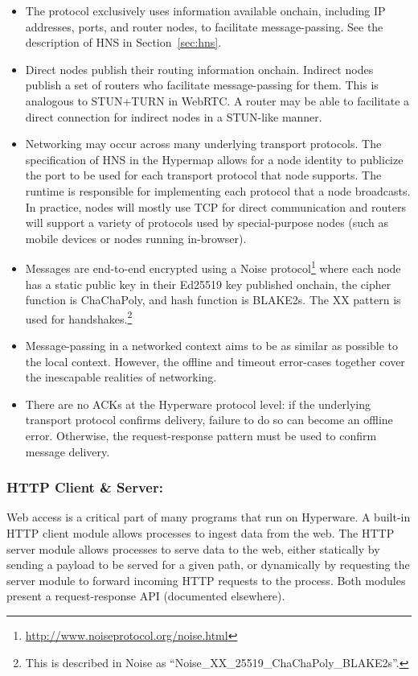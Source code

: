 \documentclass[runningheads]{llncs}
\begin{document}
\begin{itemize}
    \item The protocol exclusively uses information available onchain, including IP addresses, ports, and router nodes, to facilitate message-passing.
    See the description of HNS in Section~\ref{sec:hns}.
    \item Direct nodes publish their routing information onchain.
    Indirect nodes publish a set of routers who facilitate message-passing for them.
    This is analogous to STUN+TURN in WebRTC.
    A router may be able to facilitate a direct connection for indirect nodes in a STUN-like manner.
    \item Networking may occur across many underlying transport protocols.
    The specification of HNS in the Hypermap allows for a node identity to publicize the port to be used for each transport protocol that node supports.
    The runtime is responsible for implementing each protocol that a node broadcasts.
    In practice, nodes will mostly use TCP for direct communication and routers will support a variety of protocols used by special-purpose nodes (such as mobile devices or nodes running in-browser).
    \item Messages are end-to-end encrypted using a Noise protocol\footnote{\url{http://www.noiseprotocol.org/noise.html}}
    where each node has a static public key in their Ed25519 key published onchain, the cipher function is ChaChaPoly, and hash function is BLAKE2s.
    The XX pattern is used for handshakes.\footnote{This is described in Noise as ``Noise\_XX\_25519\_ChaChaPoly\_BLAKE2s''.}
    \item Message-passing in a networked context aims to be as similar as possible to the local context.
    However, the offline and timeout error-cases together cover the inescapable realities of networking.
    \item There are no ACKs at the Hyperware protocol level: if the underlying transport protocol confirms delivery, failure to do so can become an offline error.
    Otherwise, the request-response pattern must be used to confirm message delivery.
\end{itemize}

\subsubsection{HTTP Client \& Server:}
\label{sec:oshttp}

Web access is a critical part of many programs that run on Hyperware.
A built-in HTTP client module allows processes to ingest data from the web.
The HTTP server module allows processes to serve data to the web, either statically by sending a payload to be served for a given path, or dynamically by requesting the server module to forward incoming HTTP requests to the process.
Both modules present a request-response API (documented elsewhere).
\end{document}
